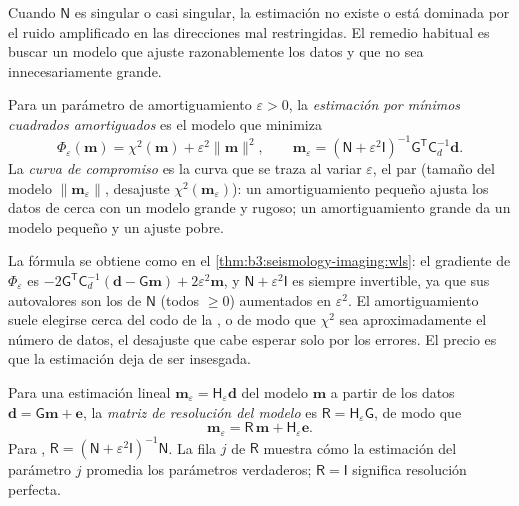 Cuando $\mathsf N$ es singular o casi singular, la estimación no existe o está
dominada por el ruido amplificado en las direcciones mal restringidas. El
remedio habitual es buscar un modelo que ajuste razonablemente los datos y que no
sea innecesariamente grande.

\begin{definition}\label{def:b3:seismology-imaging:damped}
Para un parámetro de amortiguamiento $\varepsilon > 0$, la \emph{estimación por
mínimos cuadrados amortiguados} es el modelo que minimiza
\[
  \Phi_\varepsilon(\mathbf m) = \chi^2(\mathbf m) + \varepsilon^2\|\mathbf m\|^2 ,
  \qquad
  \mathbf m_\varepsilon = \left(\mathsf N + \varepsilon^2\mathsf I\right)^{-1}
  \mathsf G^{\mathsf T}\mathsf C_d^{-1}\mathbf d .
\]
La \emph{curva de compromiso} es la curva que se traza al variar
$\varepsilon$, el par (tamaño del modelo $\|\mathbf m_\varepsilon\|$,
desajuste $\chi^2(\mathbf m_\varepsilon)$): un amortiguamiento pequeño ajusta los datos de cerca
con un modelo grande y rugoso; un amortiguamiento grande da un modelo pequeño y un ajuste pobre.
\end{definition}

La fórmula se obtiene como en el \cref{thm:b3:seismology-imaging:wls}: el gradiente
de $\Phi_\varepsilon$ es $-2\mathsf G^{\mathsf T}\mathsf C_d^{-1}(\mathbf d -
\mathsf G\mathbf m) + 2\varepsilon^2\mathbf m$, y $\mathsf N + \varepsilon^2
\mathsf I$ es siempre invertible, ya que sus autovalores son los de
$\mathsf N$ (todos $\ge 0$) aumentados en $\varepsilon^2$. El amortiguamiento suele
elegirse cerca del codo de la , o de modo que $\chi^2$ sea aproximadamente
el número de datos, el desajuste que cabe esperar solo por los errores. El precio es que la
estimación deja de ser insesgada.

\begin{definition}\label{def:b3:seismology-imaging:resolution}
Para una estimación lineal $\mathbf m_\varepsilon = \mathsf H_\varepsilon \mathbf d$
del modelo $\mathbf m$ a partir de los datos $\mathbf d = \mathsf G\mathbf m + \mathbf e$,
la \emph{matriz de resolución del modelo} es
$\mathsf R = \mathsf H_\varepsilon\mathsf G$, de modo que
\[
  \mathbf m_\varepsilon = \mathsf R\,\mathbf m + \mathsf H_\varepsilon\mathbf e .
\]
Para , $\mathsf R = (\mathsf N + \varepsilon^2\mathsf I)^{-1}
\mathsf N$. La fila $j$ de $\mathsf R$ muestra cómo la estimación del parámetro $j$
promedia los parámetros verdaderos; $\mathsf R = \mathsf I$ significa resolución perfecta.
\end{definition}

